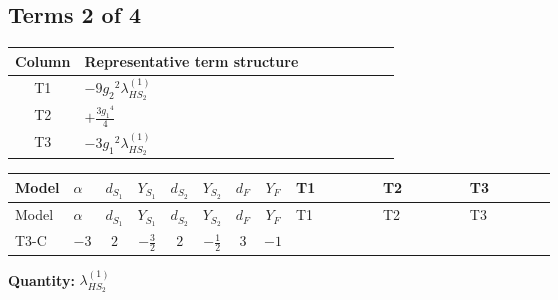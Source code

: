 \documentclass[8pt]{article}
\begin{document}
\begin{landscape}
\subsection*{Terms 2 of 4}
\begin{center}
\begin{tabular}{@{}c >{\raggedright\arraybackslash}p{0.82\linewidth}@{}}
\toprule
Column & Representative term structure \\
\midrule
T1 & \(\displaystyle -9 {g_2}^2 {\lambda_{HS_2}^{(1)}}\) \\
\midrule
T2 & \(\displaystyle +\frac{3 {g_1}^4}{4}\) \\
\midrule
T3 & \(\displaystyle -3 {g_1}^2 {\lambda_{HS_2}^{(1)}}\) \\
\midrule
\bottomrule
\end{tabular}
\end{center}
\smallskip
\tiny
\begin{longtable}{@{}llcccccc >{\raggedright\arraybackslash}p{0.21\linewidth} >{\raggedright\arraybackslash}p{0.21\linewidth} >{\raggedright\arraybackslash}p{0.21\linewidth}@{}}
\toprule
Model & $\alpha$ & $d_{S_1}$ & $Y_{S_1}$ & $d_{S_2}$ & $Y_{S_2}$ & $d_F$ & $Y_F$ & T1 & T2 & T3 \\
\midrule
\endfirsthead
\toprule
Model & $\alpha$ & $d_{S_1}$ & $Y_{S_1}$ & $d_{S_2}$ & $Y_{S_2}$ & $d_F$ & $Y_F$ & T1 & T2 & T3 \\
\midrule
\endhead
T3-C & $-3$ & $2$ & $-\frac{3}{2}$ & $2$ & $-\frac{1}{2}$ & $3$ & $-1$ & \scriptsize\adjustbox{max width=\linewidth}{$\begin{gathered} -9 {g_2}^2 {\lambda_{HS_2}^{(1)}}\end{gathered}$} & \scriptsize\adjustbox{max width=\linewidth}{$\begin{gathered} +\frac{3 {g_1}^4}{4}\end{gathered}$} & \scriptsize\adjustbox{max width=\linewidth}{$\begin{gathered} -3 {g_1}^2 {\lambda_{HS_2}^{(1)}}\end{gathered}$} \\
\midrule
\bottomrule
\end{longtable}
\clearpage
\noindent\textbf{Quantity: }$\lambda_{HS_2}^{(1)}$\par\smallskip

\end{landscape}
\end{document}
